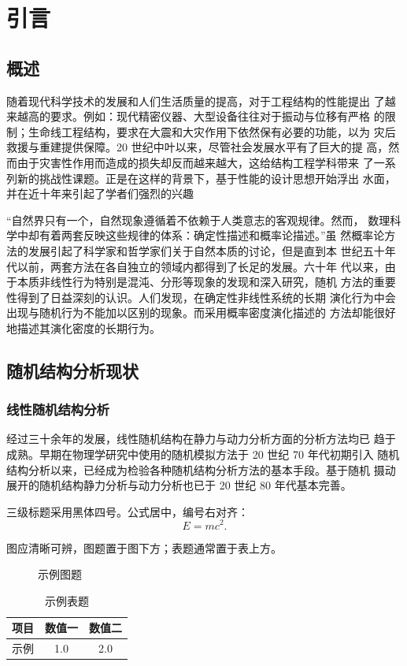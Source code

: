 \chapter{引言}

\section{概述}

随着现代科学技术的发展和人们生活质量的提高，对于工程结构的性能提出
了越来越高的要求。例如：现代精密仪器、大型设备往往对于振动与位移有严格
的限制；生命线工程结构，要求在大震和大灾作用下依然保有必要的功能，以为
灾后救援与重建提供保障。20 世纪中叶以来，尽管社会发展水平有了巨大的提
高，然而由于灾害性作用而造成的损失却反而越来越大，这给结构工程学科带来
了一系列新的挑战性课题。正是在这样的背景下，基于性能的设计思想开始浮出
水面，并在近十年来引起了学者们强烈的兴趣


``自然界只有一个，自然现象遵循着不依赖于人类意志的客观规律。然而，
数理科学中却有着两套反映这些规律的体系：确定性描述和概率论描述。''虽
然概率论方法的发展引起了科学家和哲学家们关于自然本质的讨论，但是直到本
世纪五十年代以前，两套方法在各自独立的领域内都得到了长足的发展。六十年
代以来，由于本质非线性行为特别是混沌、分形等现象的发现和深入研究，随机
方法的重要性得到了日益深刻的认识。人们发现，在确定性非线性系统的长期
演化行为中会出现与随机行为不能加以区别的现象。而采用概率密度演化描述的
方法却能很好地描述其演化密度的长期行为\cite{chen2021,soave2020}。

\section{随机结构分析现状}

\subsection{线性随机结构分析}

经过三十余年的发展，线性随机结构在静力与动力分析方面的分析方法均已
趋于成熟。早期在物理学研究中使用的随机模拟方法于 20 世纪 70 年代初期引入
随机结构分析以来，已经成为检验各种随机结构分析方法的基本手段。基于随机
摄动展开的随机结构静力分析与动力分析也已于 20 世纪 80 年代基本完善。


三级标题采用黑体四号。公式居中，编号右对齐：
\begin{equation}
  E = mc^2 .
\end{equation}

图应清晰可辨，图题置于图下方；表题通常置于表上方。

\begin{figure}[htbp]
  \centering
  \fbox{\rule{0pt}{3.5cm}\rule{8cm}{0pt}}
  \caption{示例图题}
  \label{fig:example}
\end{figure}

\begin{table}[htbp]
  \centering
  \caption{示例表题}
  \label{tab:example}
  \begin{tabular}{ccc}
    \toprule
    项目 & 数值一 & 数值二 \\
    \midrule
    示例 & 1.0 & 2.0 \\
    \bottomrule
  \end{tabular}
\end{table}
